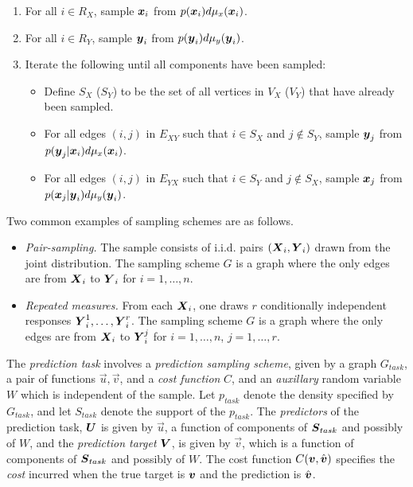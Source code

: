 \documentclass[12pt]{article}
\begin{document}
\begin{enumerate}
\item For all $i \in R_X$, sample $\boldsymbol{x}_i$ from $p(\boldsymbol{x}_i)d\mu_x(\boldsymbol{x}_i)$.
\item For all $i \in R_Y$, sample $\boldsymbol{y}_i$ from $p(\boldsymbol{y}_i)d\mu_y(\boldsymbol{y}_i)$.
\item Iterate the following until all components have been sampled:
\begin{itemize}
\item Define $S_X$ ($S_Y$) to be the set of all vertices in $V_X$ ($V_Y$) that have already been sampled.
\item For all edges $(i, j)$ in $E_{XY}$ such that $i \in S_X$ and $j \notin S_Y$, sample $\boldsymbol{y}_j$ from $p(\boldsymbol{y}_j|\boldsymbol{x}_i)d\mu_x(\boldsymbol{x}_i)$.
\item For all edges $(i, j)$ in $E_{YX}$ such that $i \in S_Y$ and $j \notin S_X$, sample $\boldsymbol{x}_j$ from $p(\boldsymbol{x}_j|\boldsymbol{y}_i)d\mu_y(\boldsymbol{y}_i)$.
\end{itemize}
\end{enumerate}

Two common examples of sampling schemes are as follows.
\begin{itemize}
\item 
\emph{Pair-sampling.}
The sample consists of i.i.d. pairs $(\boldsymbol{X}_i, \boldsymbol{Y}_i)$ drawn from the joint
distribution.  The sampling scheme $G$ is a graph where the
only edges are from $\boldsymbol{X}_i$ to $\boldsymbol{Y}_i$ for $i = 1,\hdots, n$.
\item
\emph{Repeated measures.}
From each $\boldsymbol{X}_i$, one draws $r$ conditionally independent responses
$\boldsymbol{Y}_i^1,\hdots, \boldsymbol{Y}_i^r$.  The sampling scheme $G$ is a graph where
the only edges are from $\boldsymbol{X}_i$ to $\boldsymbol{Y}_i^j$ for $i = 1,\hdots, n$, $j
= 1,\hdots, r$.
\end{itemize}

The \emph{prediction task} involves a \emph{prediction sampling
scheme}, given by a graph $G_{task}$, a pair of functions
$\vec{u}, \vec{v}$, and a \emph{cost function} $C$, and
an \emph{auxillary} random variable $W$ which is independent of the
sample.  Let $p_{task}$ denote the density specified by $G_{task}$,
and let $S_{task}$ denote the support of the $p_{task}$.
The \emph{predictors} of the prediction task, $\boldsymbol{U}$ is given by
$\vec{u}$, a function of components of $\boldsymbol{S}_{task}$ and possibly of
$W$, and the \emph{prediction target} $\boldsymbol{V}$, is given by $\vec{v}$,
which is a function of components of $\boldsymbol{S}_{task}$ and possibly of $W$.
The cost function $C(\boldsymbol{v}, \hat{\boldsymbol{v}})$ specifies the \emph{cost}
incurred when the true target is $\boldsymbol{v}$ and the prediction is
$\hat{\boldsymbol{v}}$.
\end{document}
